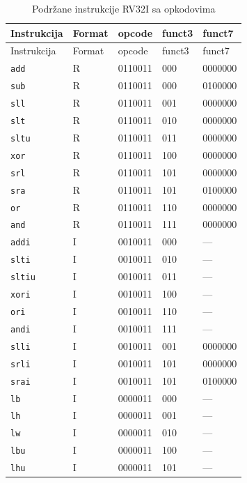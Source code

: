 {\small
\begin{longtable}{@{}lllll@{}}
  \caption{Podržane instrukcije RV32I sa opkodovima}\label{tab:opkodovi}\\
  \toprule
  Instrukcija & Format & opcode & funct3 & funct7 \\
  \midrule
  \endfirsthead
  \toprule
  Instrukcija & Format & opcode & funct3 & funct7 \\
  \midrule
  \endhead
  \texttt{add}     & R & 0110011 & 000 & 0000000 \\
  \texttt{sub}     & R & 0110011 & 000 & 0100000 \\
  \texttt{sll}     & R & 0110011 & 001 & 0000000 \\
  \texttt{slt}     & R & 0110011 & 010 & 0000000 \\
  \texttt{sltu}    & R & 0110011 & 011 & 0000000 \\
  \texttt{xor}     & R & 0110011 & 100 & 0000000 \\
  \texttt{srl}     & R & 0110011 & 101 & 0000000 \\
  \texttt{sra}     & R & 0110011 & 101 & 0100000 \\
  \texttt{or}      & R & 0110011 & 110 & 0000000 \\
  \texttt{and}     & R & 0110011 & 111 & 0000000 \\
  \midrule
  \texttt{addi}    & I & 0010011 & 000 & --- \\
  \texttt{slti}    & I & 0010011 & 010 & --- \\
  \texttt{sltiu}   & I & 0010011 & 011 & --- \\
  \texttt{xori}    & I & 0010011 & 100 & --- \\
  \texttt{ori}     & I & 0010011 & 110 & --- \\
  \texttt{andi}    & I & 0010011 & 111 & --- \\
  \texttt{slli}    & I & 0010011 & 001 & 0000000 \\
  \texttt{srli}    & I & 0010011 & 101 & 0000000 \\
  \texttt{srai}    & I & 0010011 & 101 & 0100000 \\
  \texttt{lb}      & I & 0000011 & 000 & --- \\
  \texttt{lh}      & I & 0000011 & 001 & --- \\
  \texttt{lw}      & I & 0000011 & 010 & --- \\
  \texttt{lbu}     & I & 0000011 & 100 & --- \\
  \texttt{lhu}     & I & 0000011 & 101 & --- \\

\end{longtable}}
